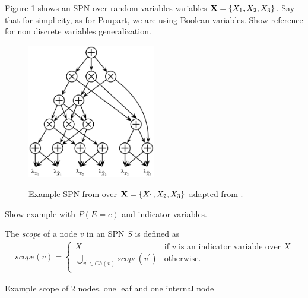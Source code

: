 %
%

Figure \ref{fig:spn} shows an SPN over random variables variables ${\bf X}=\{X_1,X_2,X_3\}$.
Say that for simplicity, as for Poupart, we are using Boolean variables. 
Show reference for non discrete variables generalization.


\begin{figure}[h]
    \begin{center}
		\includegraphics[width=0.5\textwidth]{figures/SPN.png}
		\caption{Example SPN from over ${\bf X}=\{X_1,X_2,X_3\}$ adapted from \cite{Peharz:2016wl}.}
		\label{subfig:dag}
    \label{fig:spn}
    \end{center}
\end{figure}

\begin{example}
Show example with $P(E=e)$ and indicator variables.	
\end{example}

The \emph{scope} of a node $v$ in an SPN $S$ is defined as
\begin{align*}
scope(v) = \begin{cases}
				X & \text{if $v$ is an indicator variable over $X$}\\
				\bigcup_{v^\prime \in Ch(v)}{scope(v^\prime)} &\text{otherwise.}\\
			\end{cases}
\end{align*}

\begin{example}
	Example scope of 2 nodes. one leaf and one internal node
\end{example}

